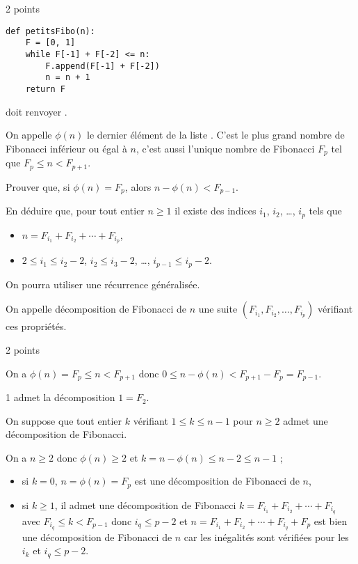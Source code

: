 \begin{Answer}2 points
\begin{lstlisting}
def petitsFibo(n):
    F = [0, 1]
    while F[-1] + F[-2] <= n:
        F.append(F[-1] + F[-2])
        n = n + 1
    return F
\end{lstlisting}
\end{Answer}
 doit renvoyer \type{[0, 1, 1, 2, 3, 5, 8, 13, 21, 34, 55, 89, 144]}.

\medskip

On appelle $\phi(n)$ le dernier élément de la liste . C'est le plus grand nombre de Fibonacci inférieur ou égal à $n$, c'est aussi l'unique nombre de Fibonacci $F_p$ tel que $F_p \le n < F_{p+1}$.
\begin{Exercise}\it

Prouver que, si $\phi(n) = F_p$, alors $n - \phi(n) < F_{p-1}$.

En déduire que, pour tout entier $n\ge 1$ il existe des indices $i_1$, $i_2$, \dots, $i_p$ tels que 
\begin{itemize}
    \item $n = F_{i_1} +  F_{i_2} +  \cdots +  F_{i_p}$, 
    \item $2\le i_1\le i_2-2$, $i_2 \le i_3 -2$, \dots, $i_{p-1}\le i_p-2$.
\end{itemize}  
On pourra utiliser une récurrence généralisée.

On appelle décomposition de Fibonacci de $n$ une suite $( F_{i_1}, F_{i_2},  \ldots,  F_{i_p})$ vérifiant ces propriétés.
\end{Exercise}
\begin{Answer}2 points

On a $\phi(n) = F_p \le n < F_{p+1}$ donc $0\le n-\phi(n) < F_{p+1}-F_p=F_{p-1}$.

1 admet la décomposition $1=F_2$.

On suppose que tout entier $k$ vérifiant $1\le k\le n-1$ pour $n\ge 2$ admet une décomposition de Fibonacci.

On a $n\ge 2$ donc $\phi(n) \ge 2$ et $k=n-\phi(n) \le n-2 \le n-1$ ; 
\begin{itemize}
    \item si $k=0$, $n = \phi(n) = F_p$ est une décomposition de Fibonacci de $n$,
    \item si $k\ge 1$, il admet une décomposition de Fibonacci $k =  F_{i_1} +  F_{i_2} +  \cdots +  F_{i_q}$ avec $F_{i_q} \le k < F_{p-1}$ donc $i_q\le p-2$ et $n =  F_{i_1} +  F_{i_2} +  \cdots +  F_{i_q} + F_p$ est bien une décomposition de Fibonacci de $n$ car les inégalités sont vérifiées pour les $i_k$ et $i_q\le p - 2$.
\end{itemize}
\end{Answer}
